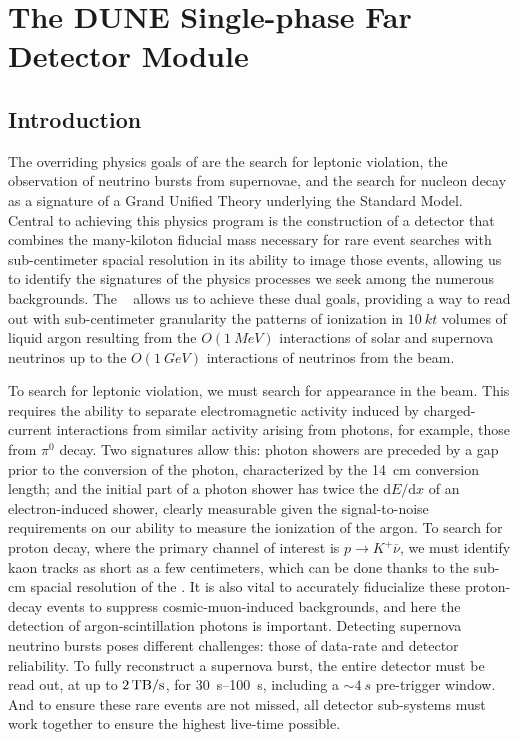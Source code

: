 \chapter{The DUNE Single-phase Far Detector Module}

\section{Introduction}
\label{sec:fdsp-exec-introduction}


The overriding physics goals of  are the search for leptonic  violation, the observation of neutrino bursts from supernovae, and the search for nucleon decay as a signature of a Grand Unified Theory underlying the Standard Model. Central to achieving this physics program is the construction of a detector that combines the many-kiloton fiducial mass necessary for rare event searches with sub-centimeter spacial resolution in its ability to image those events, allowing us to identify the signatures of the physics processes we seek among the numerous backgrounds. The  ~\cite{Rubbia:1977zz} allows us to achieve these dual goals, providing a way to read out with sub-centimeter granularity the patterns of ionization in $\SI{10}{kt}$ volumes of liquid argon resulting from the $O(\SI{1}{MeV})$ interactions of solar and supernova neutrinos up to the $O(\SI{1}{GeV})$ interactions of neutrinos from the  beam.

To search for leptonic  violation, we must search for \nue appearance in the  \numu beam. This requires the ability to separate electromagnetic activity induced by charged-current \nue interactions from similar activity arising from photons, for example, those from $\pi^{0}$ decay. Two signatures allow this: photon showers are preceded by a gap prior to the conversion of the photon, characterized by the \SI{14}{cm} conversion length; and the initial part of a photon shower has twice the $\mathrm{d}E/\mathrm{d}x$ of an electron-induced shower, clearly measurable given the signal-to-noise requirements on our ability to measure the ionization of the argon. To search for proton decay, where the primary channel of interest is $p\rightarrow K^{+}\overline{\nu}$, we must identify kaon tracks as short as a few centimeters, which can be done thanks to the sub-\si{cm} spacial resolution of the . It is also vital to accurately fiducialize these proton-decay events to suppress cosmic-muon-induced backgrounds, and here the detection of argon-scintillation photons is important. Detecting supernova neutrino bursts poses different challenges: those of data-rate and detector reliability. To fully reconstruct a supernova burst, the entire detector must be read out, at up to $\SI{2}{\tera\byte/\second}$, for \SIrange{30}{100}{s}, including a $\sim\!\SI{4}{s}$ pre-trigger window. And to ensure these rare events are not missed, all detector sub-systems must work together to ensure the highest live-time possible.

